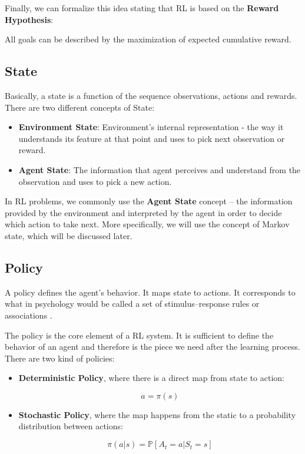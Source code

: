Finally, we can formalize this idea stating that RL is based on the \textbf{Reward Hypothesis}:

\begin{definition}
	All goals can be described by the maximization of expected cumulative reward.
\end{definition}

\subsection{State}

Basically, a state is a function of the sequence observations, actions and rewards. There are two different concepts of State:

\begin{itemize}
	\item \textbf{Environment State}: Environment's internal representation - the way it understands its feature at that point and uses to pick next observation or reward.
	\item \textbf{Agent State}: The information that agent perceives and understand from the observation and uses to pick a new action.
\end{itemize}

In RL problems, we commonly use the \textbf{Agent State} concept -- the information provided by the environment and interpreted by the agent in order to decide which action to take next. More specifically, we will use the concept of Markov state, which will be discussed later.

\subsection{Policy}

A policy defines the agent's behavior. It maps state to actions. It corresponds to what in psychology would be called a set of stimulus–response rules or associations \cite{sutton1998rli}. 

The policy is the core element of a RL system. It is sufficient to define the behavior of an agent and therefore is the piece we need after the learning process. There are two kind of policies:

\begin{itemize}
	\item \textbf{Deterministic Policy}, where there is a direct map from state to action:
	
	\begin{equation}
	a = \pi(s)
	\end{equation}
	
	\item \textbf{Stochastic Policy}, where the map happens from the static to a probability distribution between actions:
	
	\begin{equation}
	\pi (a | s) = \mathbb{P}[A_{t} = a | S_{t} = s]
	\end{equation}
\end{itemize}

